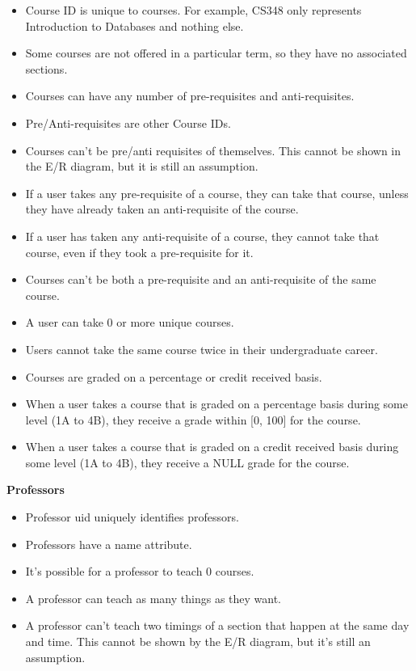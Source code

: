 \documentclass[12pt, a4paper]{article}
\begin{document}
\begin{itemize}
    \item Course ID is unique to courses. For example, CS348 only represents Introduction to Databases and nothing else.
    \item Some courses are not offered in a particular term, so they have no associated sections.
    \item Courses can have any number of pre-requisites and anti-requisites.
    \item Pre/Anti-requisites are other Course IDs.
    \item Courses can't be pre/anti requisites of themselves. This cannot be shown in the E/R diagram, but it is still an assumption.
    \item If a user takes any pre-requisite of a course, they can take that course, unless they have already taken an anti-requisite of the course.
    \item If a user has taken any anti-requisite of a course, they cannot take that course, even if they took a pre-requisite for it.
    \item Courses can't be both a pre-requisite and an anti-requisite of the same course.
    \item A user can take 0 or more unique courses.
    \item Users cannot take the same course twice in their undergraduate career.
    \item Courses are graded on a percentage or credit received basis.
    \item When a user takes a course that is graded on a percentage basis during some level (1A to 4B), they receive a grade within [0, 100] for the course.
    \item When a user takes a course that is graded on a credit received basis during some level (1A to 4B), they receive a NULL grade for the course.
\end{itemize}
\textbf{Professors}
\begin{itemize}
    \item Professor uid uniquely identifies professors.
    \item Professors have a name attribute.
    \item It's possible for a professor to teach 0 courses.
    \item A professor can teach as many things as they want.
    \item A professor can't teach two timings of a section that happen at the same day and time. This cannot be shown by the E/R diagram, but it's still an assumption.
\end{itemize}
\end{document}
